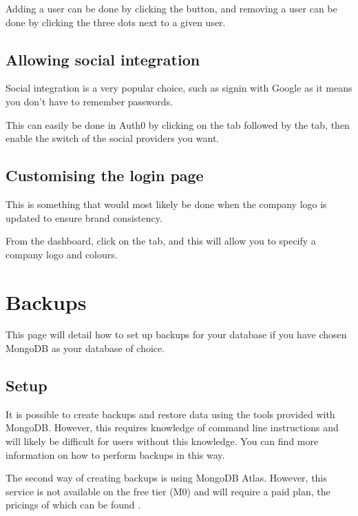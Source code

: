 \documentclass[letterpaper,10pt,english]{sphinxmanual}
\let\oldsubsection\subsection
\renewcommand{\subsection}{\needspace{6\baselineskip}\oldsubsection}
\begin{document}
Adding a user can be done by clicking the  button, and
removing a user can be done by clicking the three dots next to a given
user.


\subsection{Allowing social integration}
\label{\detokenize{docs/Expansion/auth-expansion:allowing-social-integration}}
Social integration is a very popular choice, such as signin with Google
as it means you don’t have to remember passwords.

This can easily be done in Auth0 by clicking on the  tab
followed by the  tab, then enable the switch of the social
providers you want.


\subsection{Customising the login page}
\label{\detokenize{docs/Expansion/auth-expansion:customising-the-login-page}}
This is something that would most likely be done when the company logo
is updated to ensure brand consistency.

From the dashboard, click on the  tab, and this will
allow you to specify a company logo and colours.


\section{Backups}
\label{\detokenize{docs/Expansion/backups:backups}}\label{\detokenize{docs/Expansion/backups::doc}}
This page will detail how to set up backups for your database if you
have chosen MongoDB as your database of choice.


\subsection{Setup}
\label{\detokenize{docs/Expansion/backups:setup}}
It is possible to create backups and restore data using the tools
provided with MongoDB. However, this requires knowledge of command line
instructions and will likely be difficult for users without this
knowledge. You can find more information
on how to perform backups in this way.

The second way of creating backups is using MongoDB Atlas. However, this
service is not available on the free tier (M0) and will require a paid
plan, the pricings of which can be found
.
\end{document}
